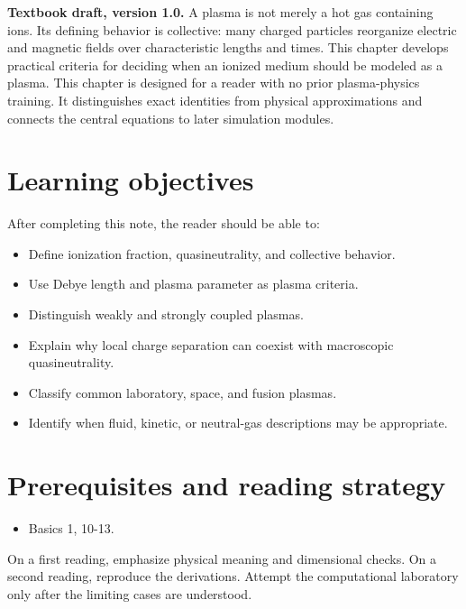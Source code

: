 \documentclass[11pt]{article}
\begin{document}

\begin{overviewbox}
\textbf{Textbook draft, version 1.0.} A plasma is not merely a hot gas containing ions. Its defining behavior is collective: many charged particles reorganize electric and magnetic fields over characteristic lengths and times. This chapter develops practical criteria for deciding when an ionized medium should be modeled as a plasma. This chapter is designed for a reader with no prior plasma-physics training. It distinguishes exact identities from physical approximations and connects the central equations to later simulation modules.
\end{overviewbox}

\ProjectTOC

\section{Learning objectives}
After completing this note, the reader should be able to:
\begin{itemize}[leftmargin=1.6em]
\item Define ionization fraction, quasineutrality, and collective behavior.
\item Use Debye length and plasma parameter as plasma criteria.
\item Distinguish weakly and strongly coupled plasmas.
\item Explain why local charge separation can coexist with macroscopic quasineutrality.
\item Classify common laboratory, space, and fusion plasmas.
\item Identify when fluid, kinetic, or neutral-gas descriptions may be appropriate.
\end{itemize}

\section{Prerequisites and reading strategy}
\begin{itemize}[leftmargin=1.6em]
\item Basics 1, 10-13.
\end{itemize}
On a first reading, emphasize physical meaning and dimensional checks. On a second reading, reproduce the derivations. Attempt the computational laboratory only after the limiting cases are understood.
\end{document}
